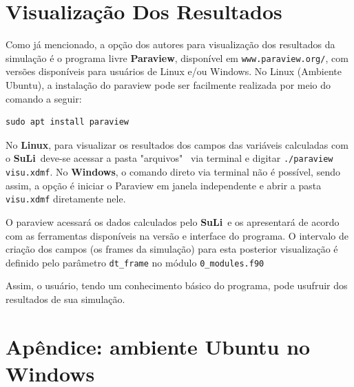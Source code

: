 \documentclass[12pt, a4paper]{article}
\newcommand{\SL}{{\bf SuLi}}
\begin{document}

\newpage
\section{Visualização Dos Resultados}	\label{visu}
Como já mencionado, a opção dos autores para visualização dos resultados da simulação é o programa livre \textbf{Paraview}, disponível em \verb|www.paraview.org/|, com versões disponíveis para usuários de Linux e/ou Windows. No Linux (Ambiente Ubuntu), a instalação do paraview pode ser facilmente realizada por meio do comando a seguir:

\begin{verbatim}
sudo apt install paraview
\end{verbatim}

No \textbf{Linux}, para visualizar os resultados dos campos das variáveis calculadas com o \SL\ deve-se acessar a pasta "arquivos" \, via terminal e digitar \verb|./paraview visu.xdmf|. No \textbf{Windows}, o comando direto via terminal não é possível, sendo assim, a opção é iniciar o Paraview em janela independente e abrir a pasta \verb|visu.xdmf| diretamente nele.



O paraview acessará os dados calculados pelo \SL\ e os apresentará de acordo com as ferramentas disponíveis na versão e interface do programa. O intervalo de criação dos campos (os frames da simulação) para esta posterior visualização é definido pelo parâmetro \verb|dt_frame| no módulo \verb|0_modules.f90|

Assim, o usuário, tendo um conhecimento básico do programa, pode usufruir dos resultados de sua simulação.




\newpage
\appendix
\section{Apêndice: ambiente Ubuntu no Windows}
\label{InstallUbuntu}
\end{document}
